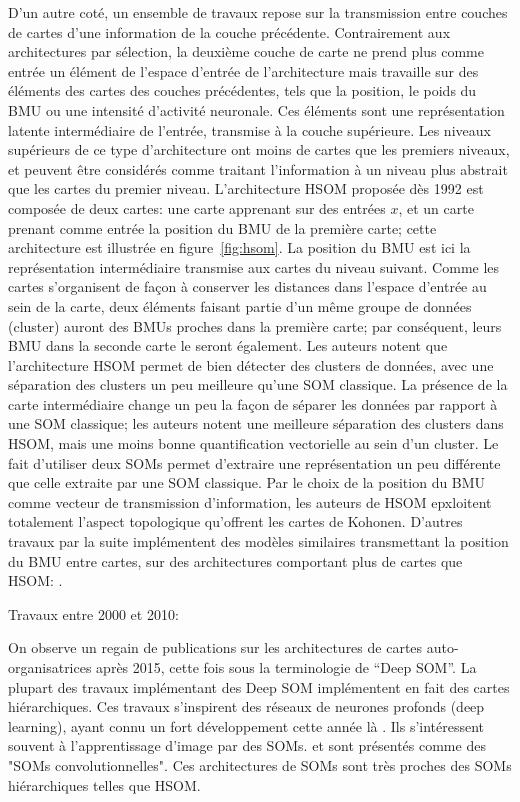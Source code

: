 \documentclass[../main]{subfiles}
\begin{document}
D'un autre coté, un ensemble de travaux repose sur la transmission entre couches de cartes d'une information de la couche précédente. Contrairement aux architectures par sélection, la deuxième couche de carte ne prend plus comme entrée un élément de l'espace d'entrée de l'architecture mais travaille sur des éléments des cartes des couches précédentes, tels que la position, le poids du BMU ou une intensité d'activité neuronale. 
Ces éléments sont une représentation latente intermédiaire de l'entrée, transmise à la couche supérieure. Les niveaux supérieurs de ce type d'architecture ont moins de cartes que les premiers niveaux, et peuvent être considérés comme traitant l'information à un niveau plus abstrait que les cartes du premier niveau.
L'architecture  HSOM \cite{lampinen_clustering_1992} proposée dès 1992 est composée de deux cartes: une carte apprenant sur des entrées $x$, et un carte prenant comme entrée la position du BMU de la première carte; cette architecture est illustrée en figure~\ref{fig:hsom}. La position du BMU est ici la représentation intermédiaire transmise aux cartes du niveau suivant.
Comme les cartes s'organisent de façon à conserver les distances dans l'espace d'entrée au sein de la carte, deux éléments faisant partie d'un même groupe de données (cluster) auront des BMUs proches dans la première carte; par conséquent, leurs BMU dans la seconde carte le seront également. 
Les auteurs notent que l'architecture HSOM permet de bien détecter des clusters de données, avec une séparation des clusters un peu meilleure qu'une SOM classique. La présence de la carte intermédiaire change un peu la façon de séparer les données par rapport à une SOM classique; les auteurs notent une meilleure séparation des clusters dans HSOM, mais une moins bonne quantification vectorielle au sein d'un cluster. Le fait d'utiliser deux SOMs permet d'extraire une représentation un peu différente que celle extraite par une SOM classique.
Par le choix de la position du BMU comme vecteur de transmission d'information, les auteurs de HSOM epxloitent totalement l'aspect topologique qu'offrent les cartes de Kohonen. D'autres travaux par la suite implémentent des modèles similaires transmettant la position du BMU entre cartes, sur des architectures comportant plus de cartes que HSOM: \cite{hagenauer_hierarchical_2013}.


Travaux entre 2000 et 2010:
\cite{dittenbach_growing_2000,yamaguchi_adaptive_2010,gunes_kayacik_hierarchical_2007,wang_comparisonal_2007}

On observe un regain de publications sur les architectures de cartes auto-organisatrices après 2015, cette fois sous la terminologie de “Deep SOM”. La plupart des travaux implémentant des Deep SOM implémentent en fait des cartes hiérarchiques.
Ces travaux s'inspirent des réseaux de neurones profonds (deep learning), ayant connu un fort développement cette année là \cite{lecun_deep_2015}. 
Ils s'intéressent souvent à l'apprentissage d'image par des SOMs. \cite{Liu2015DeepSM,hankins_somnet_2018,wickramasinghe_deep_2019,aly_deep_2020,sakkari_convolutional_2020,dozono_convolutional_2016,nawaratne_hierarchical_2020,mici_self-organizing_2018} et sont présentés comme des "SOMs convolutionnelles".
Ces architectures de SOMs sont très proches des SOMs hiérarchiques telles que HSOM.
\end{document}
